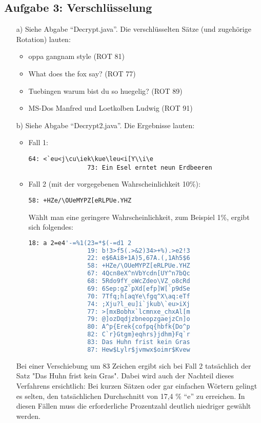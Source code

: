 \documentclass{article}
\begin{document}
    \subsection*{Aufgabe 3: Verschlüsselung}
    \begin{enumerate}
        \item[a)] Siehe Abgabe "`Decrypt.java"'. Die verschlüsselten Sätze (und zugehörige Rotation) lauten:
        \begin{itemize}
            \item oppa gangnam style (ROT 81)
            \item What does the fox say? (ROT 77)
            \item Tuebingen warum bist du so huegelig? (ROT 89)
            \item MS-Dos Manfred und Loetkolben Ludwig (ROT 91)
        \end{itemize}
        \item[b)] Siehe Abgabe "`Decrypt2.java"'. Die Ergebnisse lauten:
        \begin{itemize}
            \item Fall 1:
            \begin{lstlisting}[numbers=none]
                64: <`eu<j\cu\iek\kue\leu<i[Y\\i\e
                73: Ein Esel erntet neun Erdbeeren
            \end{lstlisting}
            \item Fall 2 (mit der vorgegebenen Wahrscheinlichkeit 10\%):
            \begin{lstlisting}[numbers=none]
                58: +HZe/\OUeMYPZ[eRLPUe.YHZ
            \end{lstlisting}
            Wählt man eine geringere Wahrscheinlichkeit, zum Beispiel 1\%, ergibt sich folgendes: 
            \begin{lstlisting}[numbers=none, language=bash]
                18: a 2=e4'-=%1(23=*$(-=d1 2
                19: b!3>f5(.>&2)34>+%).>e2!3
                22: e$6Ai8+1A)5,67A.(,1Ah5$6
                58: +HZe/\OUeMYPZ[eRLPUe.YHZ
                67: 4Qcn8eX^nVbYcdn[UY^n7bQc
                68: 5Rdo9fY_oWcZdeo\VZ_o8cRd
                69: 6Sep:gZ`pXd[efp]W[`p9dSe
                70: 7Tfq;h[aqYe\fgq^X\aq:eTf
                74: ;Xju?l_eu]i`jkub\`eu>iXj
                77: >[mxBobhx`lcmnxe_chxAl[m
                79: @]ozDqdjzbneopzgaejzCn]o
                80: A^p{Erek{cofpq{hbfk{Do^p
                82: C`r}Gtgm}eqhrs}jdhm}Fq`r
                83: Das Huhn frist kein Gras
                87: Hew$Lylr$jvmwx$oimr$Kvew
            \end{lstlisting}    
        \end{itemize} 
        Bei einer Verschiebung um 83 Zeichen ergibt sich bei Fall 2 tatsächlich der Satz "Das Huhn frist kein Gras". Dabei wird auch der Nachteil dieses Verfahrens ersichtlich: Bei kurzen Sätzen oder gar einfachen Wörtern gelingt es selten, den tatsächlichen Durchschnitt von 17,4 \% "`e"' zu erreichen. In diesen Fällen muss die erforderliche Prozentzahl deutlich niedriger gewählt werden. 
    \end{enumerate}
\end{document}
